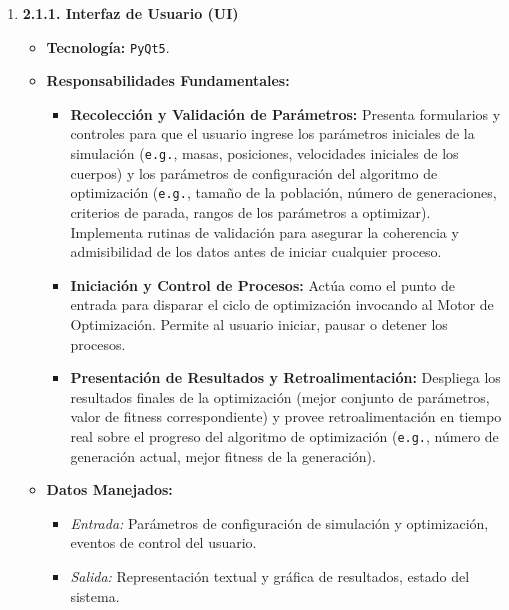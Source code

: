 \begin{enumerate} %
    \item \textbf{2.1.1. Interfaz de Usuario (UI)}
    \begin{itemize}
        \item \textbf{Tecnología:} \texttt{PyQt5}.
        \item \textbf{Responsabilidades Fundamentales:}
        \begin{itemize}
            \item \textbf{Recolección y Validación de Parámetros:} Presenta formularios y controles para que el usuario ingrese los parámetros iniciales de la simulación (\texttt{e.g.}, masas, posiciones, velocidades iniciales de los cuerpos) y los parámetros de configuración del algoritmo de optimización (\texttt{e.g.}, tamaño de la población, número de generaciones, criterios de parada, rangos de los parámetros a optimizar). Implementa rutinas de validación para asegurar la coherencia y admisibilidad de los datos antes de iniciar cualquier proceso.
            \item \textbf{Iniciación y Control de Procesos:} Actúa como el punto de entrada para disparar el ciclo de optimización invocando al Motor de Optimización. Permite al usuario iniciar, pausar o detener los procesos.
            \item \textbf{Presentación de Resultados y Retroalimentación:} Despliega los resultados finales de la optimización (mejor conjunto de parámetros, valor de fitness correspondiente) y provee retroalimentación en tiempo real sobre el progreso del algoritmo de optimización (\texttt{e.g.}, número de generación actual, mejor fitness de la generación).
        \end{itemize}
        \item \textbf{Datos Manejados:}
        \begin{itemize}
            \item \textit{Entrada:} Parámetros de configuración de simulación y optimización, eventos de control del usuario.
            \item \textit{Salida:} Representación textual y gráfica de resultados, estado del sistema.
        \end{itemize}
    \end{itemize}


\end{enumerate}
